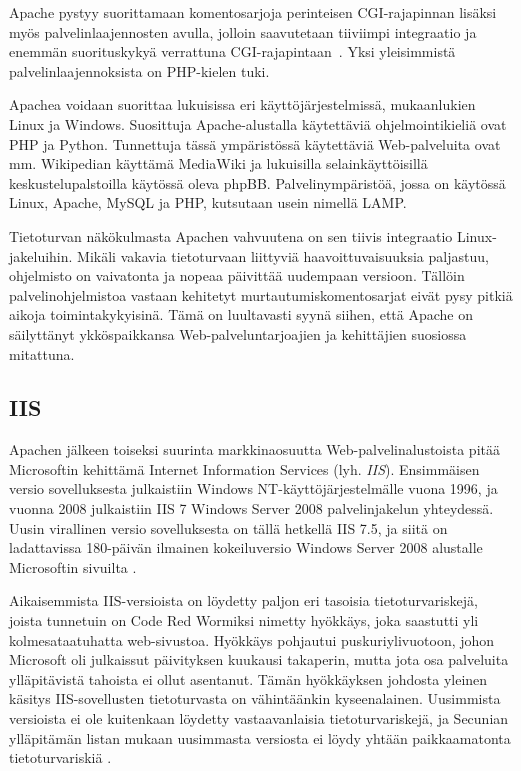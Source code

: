 Apache pystyy suorittamaan komentosarjoja perinteisen CGI-rajapinnan
lisäksi myös palvelinlaajennosten avulla, jolloin saavutetaan
tiiviimpi integraatio ja enemmän suorituskykyä verrattuna
CGI-rajapintaan~\cite{cginopeus}. Yksi yleisimmistä
palvelinlaajennoksista on PHP-kielen tuki.

Apachea voidaan suorittaa lukuisissa eri käyttöjärjestelmissä,
mukaanlukien Linux ja Windows. Suosittuja Apache-alustalla käytettäviä
ohjelmointikieliä ovat PHP ja Python. Tunnettuja tässä ympäristössä
käytettäviä Web-palveluita ovat mm. Wikipedian käyttämä MediaWiki ja
lukuisilla selainkäyttöisillä keskustelupalstoilla käytössä oleva
phpBB. Palvelinympäristöä, jossa on käytössä Linux, Apache, MySQL ja
PHP, kutsutaan usein nimellä LAMP.

Tietoturvan näkökulmasta Apachen vahvuutena on sen tiivis integraatio
Linux-jakeluihin. Mikäli vakavia tietoturvaan liittyviä
haavoittuvaisuuksia paljastuu, ohjelmisto on vaivatonta ja nopeaa
päivittää uudempaan versioon. Tällöin palvelinohjelmistoa vastaan
kehitetyt murtautumiskomentosarjat eivät pysy pitkiä aikoja
toimintakykyisinä.  Tämä on luultavasti syynä siihen, että Apache on
säilyttänyt ykköspaikkansa Web-palveluntarjoajien ja kehittäjien
suosiossa mitattuna.

\subsection{IIS}

Apachen jälkeen toiseksi suurinta markkinaosuutta Web-palvelinalustoista pitää Microsoftin kehittämä Internet Information Services (lyh. \textit{IIS}). Ensimmäisen versio sovelluksesta
julkaistiin Windows NT-käyttöjärjestelmälle vuona 1996, ja vuonna 2008 julkaistiin IIS 7 Windows Server 2008 palvelinjakelun yhteydessä. Uusin virallinen versio sovelluksesta on tällä hetkellä   
IIS 7.5, ja siitä on ladattavissa 180-päivän ilmainen kokeiluversio Windows Server 2008 alustalle Microsoftin sivuilta \cite{IIS}.

Aikaisemmista IIS-versioista on löydetty paljon eri tasoisia tietoturvariskejä, joista tunnetuin on Code Red Wormiksi nimetty hyökkäys, joka saastutti yli kolmesataatuhatta web-sivustoa.
Hyökkäys pohjautui puskuriylivuotoon, johon Microsoft oli julkaissut päivityksen kuukausi takaperin, mutta jota osa palveluita ylläpitävistä tahoista ei ollut asentanut. Tämän hyökkäyksen
johdosta yleinen käsitys IIS-sovellusten tietoturvasta on vähintäänkin kyseenalainen. Uusimmista versioista ei ole kuitenkaan löydetty vastaavanlaisia tietoturvariskejä, ja Secunian
ylläpitämän listan mukaan uusimmasta versiosta ei löydy yhtään paikkaamatonta tietoturvariskiä \cite{Secunia}.

